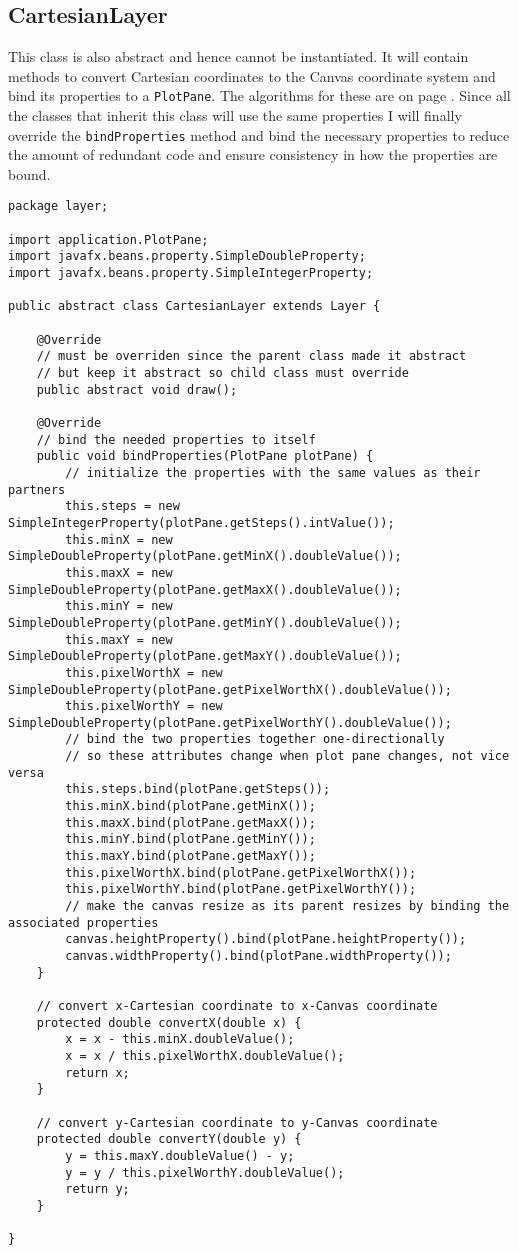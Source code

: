 \documentclass[../../../../main.tex]{subfiles}
\begin{document}
\subsection{CartesianLayer}
This class is also abstract and hence cannot be instantiated. It will contain methods to convert Cartesian coordinates to the Canvas coordinate system and bind its properties to a \texttt{PlotPane}. The algorithms for these are on page \pageref{alg:coordConv}. Since all the classes that inherit this class will use the same properties I will finally override the \texttt{bindProperties{}} method and bind the necessary properties to reduce the amount of redundant code and ensure consistency in how the properties are bound.
\begin{verbatim}
package layer;

import application.PlotPane;
import javafx.beans.property.SimpleDoubleProperty;
import javafx.beans.property.SimpleIntegerProperty;

public abstract class CartesianLayer extends Layer {

	@Override
	// must be overriden since the parent class made it abstract
	// but keep it abstract so child class must override
	public abstract void draw();

	@Override
	// bind the needed properties to itself
	public void bindProperties(PlotPane plotPane) {
		// initialize the properties with the same values as their partners
		this.steps = new SimpleIntegerProperty(plotPane.getSteps().intValue());
		this.minX = new SimpleDoubleProperty(plotPane.getMinX().doubleValue());
		this.maxX = new SimpleDoubleProperty(plotPane.getMaxX().doubleValue());
		this.minY = new SimpleDoubleProperty(plotPane.getMinY().doubleValue());
		this.maxY = new SimpleDoubleProperty(plotPane.getMaxY().doubleValue());
		this.pixelWorthX = new SimpleDoubleProperty(plotPane.getPixelWorthX().doubleValue());
		this.pixelWorthY = new SimpleDoubleProperty(plotPane.getPixelWorthY().doubleValue());
		// bind the two properties together one-directionally
		// so these attributes change when plot pane changes, not vice versa
		this.steps.bind(plotPane.getSteps());
		this.minX.bind(plotPane.getMinX());
		this.maxX.bind(plotPane.getMaxX());
		this.minY.bind(plotPane.getMinY());
		this.maxY.bind(plotPane.getMaxY());
		this.pixelWorthX.bind(plotPane.getPixelWorthX());
		this.pixelWorthY.bind(plotPane.getPixelWorthY());
		// make the canvas resize as its parent resizes by binding the associated properties
		canvas.heightProperty().bind(plotPane.heightProperty());
		canvas.widthProperty().bind(plotPane.widthProperty());
	}

	// convert x-Cartesian coordinate to x-Canvas coordinate
	protected double convertX(double x) {
		x = x - this.minX.doubleValue();
		x = x / this.pixelWorthX.doubleValue();
		return x;
	}

	// convert y-Cartesian coordinate to y-Canvas coordinate
	protected double convertY(double y) {
		y = this.maxY.doubleValue() - y;
		y = y / this.pixelWorthY.doubleValue();
		return y;
	}

}
\end{verbatim}
\newpage
\end{document}
